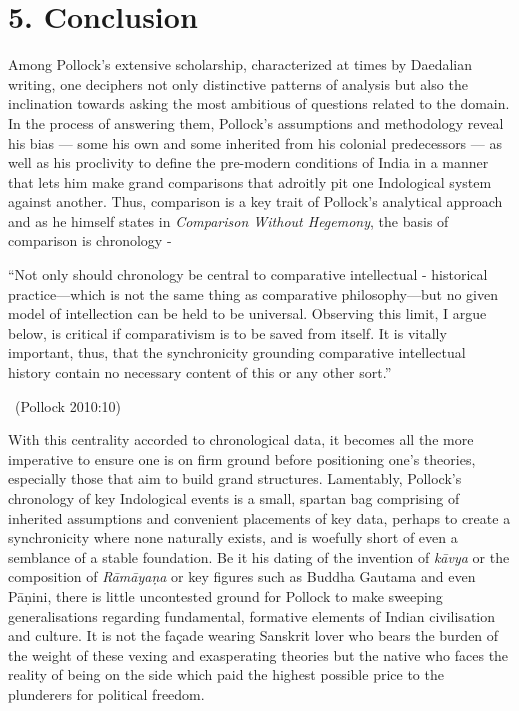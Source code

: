 \vspace{-.3cm}

\section*{5. Conclusion}

Among Pollock’s extensive scholarship, characterized at times by Daedalian writing, one deciphers not only distinctive patterns of analysis but also the inclination towards asking the most ambitious of questions related to the domain. In the process of answering them, Pollock’s assumptions and methodology reveal his bias — some his own and some inherited from his colonial predecessors — as well as his proclivity to define the pre-modern conditions of India in a manner that lets him make grand comparisons that adroitly pit one Indological system against another. Thus, comparison is a key trait of Pollock’s analytical approach and as he himself states in \textit{Comparison Without Hegemony}, the basis of comparison is chronology -

\begin{myquote}
“Not only should chronology be central to comparative intellectual - historical practice—which is not the same thing as comparative philosophy—but no given model of intellection can be held to be universal. Observing this limit, I argue below, is critical if comparativism is to be saved from itself. It is vitally important, thus, that the synchronicity grounding comparative intellectual history contain no necessary content of this or any other sort.” 

~\hfill (Pollock 2010:10)
\end{myquote}

With this centrality accorded to chronological data, it becomes all the more imperative to ensure one is on firm ground before positioning one’s theories, especially those that aim to build grand structures. Lamentably, Pollock’s chronology of key Indological events is a small, spartan bag comprising of inherited assumptions and convenient placements of key data, perhaps to create a synchronicity where none naturally exists, and is woefully short of even a semblance of a stable foundation. Be it his dating of the invention of \textit{kāvya} or the composition of \textit{Rāmāyaṇa} or key figures such as Buddha Gautama and even Pāṇini, there is little uncontested ground for Pollock to make sweeping generalisations regarding fundamental, formative elements of Indian civilisation and culture. It is not the façade wearing Sanskrit lover who bears the burden of the weight of these vexing and exasperating theories but the native who faces the reality of being on the side which paid the highest possible price to the plunderers for political freedom.

